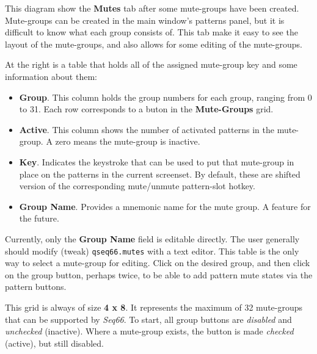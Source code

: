    This diagram show the \textbf{Mutes} tab after some mute-groups have been
   created.  Mute-groups can be created in the main window's patterns panel,
   but it is difficult to know what each group consists of.  This tab make it
   easy to see the layout of the mute-groups, and also allows for some editing
   of the mute-groups.

   \setcounter{ItemCounter}{0}      %

   At the right is a table that holds all of the assigned mute-group key and
   some information about them:

      \begin{itemize}
         \item \textbf{Group}.
            This column holds the group numbers for each group, ranging from 0
            to 31.  Each row corresponds to a buton in the \textbf{Mute-Groups}
            grid.
         \item \textbf{Active}.
            This column shows the number of activated patterns in the
            mute-group.  A zero means the mute-group is inactive.
         \item \textbf{Key}.
            Indicates the keystroke that can be used to put that mute-group in
            place on the patterns in the current screenset.
            By default, these are shifted version of the corresponding
            mute/unmute pattern-slot hotkey.
         \item \textbf{Group Name}.
            Provides a mnemonic name for the mute group.  A feature for the
            future.
      \end{itemize}

   Currently, only the \textbf{Group Name} field is editable directly.
   The user generally should modify (tweak)
   \texttt{qseq66.mutes} with a text editor.
   This table is the only way to select a mute-group for editing.
   Click on the desired group, and then click on the group button, perhaps
   twice, to be able to add pattern mute states via the pattern buttons.

   This grid is always of size \textbf{4 x 8}.  It represents the maximum of 32
   mute-groups that can be supported by \textsl{Seq66}.
   To start, all group buttons are \textsl{disabled} and
   \textsl{unchecked} (inactive).
   Where a mute-group exists, the button is made \textsl{checked} (active),
   but still disabled.

